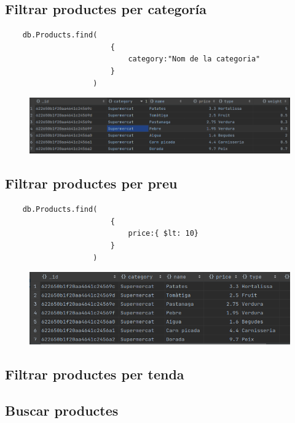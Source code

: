 \subsection{Filtrar productes per categoría}

\begin{verbatim}
    db.Products.find(
                        {
                            category:"Nom de la categoria"
                        }
                    )
\end{verbatim}

\begin{figure}[htpb!]
    \centering
    \includegraphics[width=400pt]{figures/Filtratge categories.png}
\end{figure}

\subsection{Filtrar productes per preu}

\begin{verbatim}
    db.Products.find(
                        {
                            price:{ $lt: 10}
                        }
                    )
\end{verbatim}

\begin{figure}[htpb!]
    \centering
    \includegraphics[width=400pt]{figures/preu.png}
\end{figure}

\subsection{Filtrar productes per tenda}

\subsection{Buscar productes}

